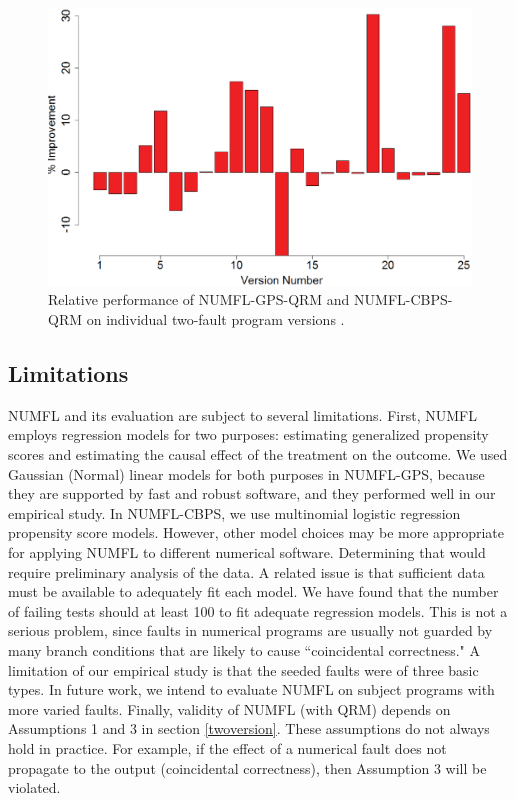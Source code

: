 \documentclass[times]{stvrauth}
\begin{document}
\begin{figure}[!thpb]
\centering
\includegraphics[width=\textwidth]{CBPS_VS_GPS_MultipleFault.eps}
\caption{Relative performance of NUMFL-GPS-QRM and NUMFL-CBPS-QRM on individual two-fault program versions .}
\label{CBPS_VS_GPS_MultipleFault}
\end{figure}

\subsection{Limitations}
NUMFL and its evaluation are subject to several limitations.  First, NUMFL employs regression models for two purposes: estimating generalized propensity scores and estimating the causal effect of the treatment on the outcome.  We used Gaussian (Normal) linear models for both purposes in NUMFL-GPS, because they are supported by fast and robust software, and they performed well in our empirical study. In NUMFL-CBPS, we use multinomial logistic regression propensity score models.  However, other model choices may be more appropriate for applying NUMFL to different numerical software.  Determining that would require preliminary analysis of the data.  A related issue is that sufficient data must be available to adequately fit each model.  We have found that the number of failing tests should at least 100 to fit adequate regression models.  This is not a serious problem, since faults in numerical programs are usually not guarded by many branch conditions that are likely to cause ``coincidental correctness."  A limitation of our empirical study is that the seeded faults were of three basic types.  In future work, we intend to evaluate NUMFL on subject programs with more varied faults.  Finally, validity of NUMFL (with QRM) depends on Assumptions 1 and 3 in section \ref{twoversion}.  These assumptions do not always hold in practice.  For example, if the effect of a numerical fault does not propagate to the output (coincidental correctness), then Assumption 3 will be violated.
\end{document}
